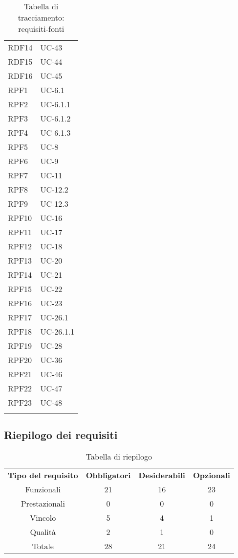 \begin{longtable}{| p{5cm} | p{5cm} |}
		\rowcolor{LightGray}
		RDF14 & UC-43\\
		RDF15 & UC-44\\
		\rowcolor{LightGray}
		RDF16 & UC-45\\
		RPF1 & UC-6.1\\
		\rowcolor{LightGray}
		RPF2 & UC-6.1.1\\
		RPF3 & UC-6.1.2\\
		\rowcolor{LightGray}
		RPF4 & UC-6.1.3\\
		RPF5 & UC-8\\
		\rowcolor{LightGray}
		RPF6 & UC-9\\
		RPF7 & UC-11\\
		\rowcolor{LightGray}
		RPF8 & UC-12.2\\
		RPF9 & UC-12.3\\
		\rowcolor{LightGray}
		RPF10 & UC-16\\
		RPF11 & UC-17\\
		\rowcolor{LightGray}
		RPF12 & UC-18\\
		RPF13 & UC-20\\
		\rowcolor{LightGray}
		RPF14 & UC-21\\
		RPF15 & UC-22\\
		\rowcolor{LightGray}
		RPF16 & UC-23\\
		RPF17 & UC-26.1\\
		\rowcolor{LightGray}
		RPF18 & UC-26.1.1\\
		RPF19 & UC-28\\
		\rowcolor{LightGray}
		RPF20 & UC-36\\
		RPF21 & UC-46\\
		\rowcolor{LightGray}
		RPF22 & UC-47\\
		RPF23 & UC-48\\
		\rowcolor{LightGray}		
		\hline
		\caption{Tabella di tracciamento: requisiti-fonti}
\end{longtable}

\subsection{Riepilogo dei requisiti}
\begin{table}[h]
\centering
\begin{tabular}{| c | c | c | c |}
		\rowcolor{LightBlue}
		\color{white}\bfseries Tipo del requisito & \color{white}\bfseries Obbligatori & \color{white}\bfseries Desiderabili & \color{white}\bfseries Opzionali \\[0.25cm]
		 Funzionali & 21 & 16 & 23 \\
		 Prestazionali & 0 & 0 & 0 \\
		 Vincolo & 5 & 4 & 1 \\
		 Qualità & 2 & 1 & 0 \\
		 Totale & 28 & 21 & 24 \\ \hline
\end{tabular}
		\caption{Tabella di riepilogo}
\end{table}


\newpage